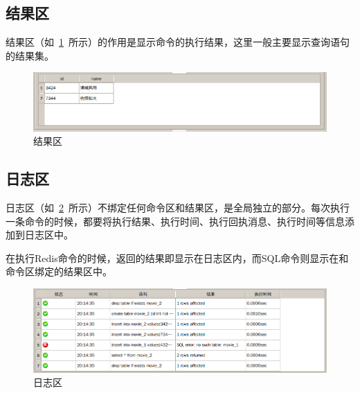 \documentclass{zjutthesis}
\begin{document}
\subsection{结果区}
结果区（如~\ref{fig:ResultPart}~所示）的作用是显示命令的执行结果，这里一般主要显示查询语句的结果集。
\begin{figure}[H]
\centering
\includegraphics[width=\textwidth]{ResultPart}
\caption{结果区}\label{fig:ResultPart}
\vspace{\baselineskip} %
\end{figure}

\subsection{日志区}
日志区（如~\ref{fig:LoggingPart}~所示）不绑定任何命令区和结果区，是全局独立的部分。每次执行一条命令的时候，都要将执行结果、执行时间、执行回执消息、执行时间等信息添加到日志区中。

在执行Redis命令的时候，返回的结果即显示在日志区内，而SQL命令则显示在和命令区绑定的结果区中。

\begin{figure}[H]
\centering
\includegraphics[width=\textwidth]{LoggingPart}
\caption{日志区}\label{fig:LoggingPart}
\vspace{\baselineskip} %
\end{figure}
\end{document}

